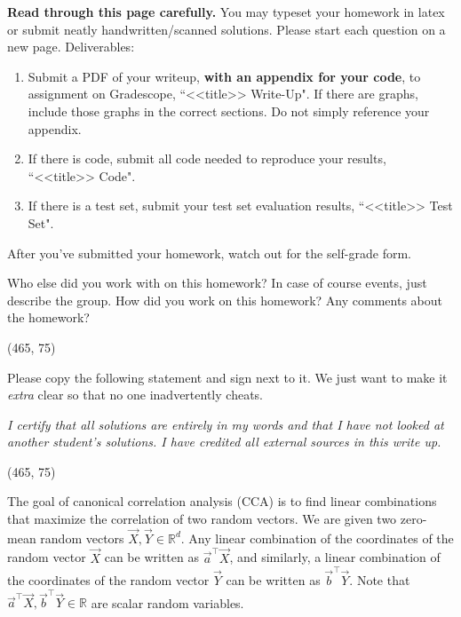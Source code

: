 \documentclass[preview]{standalone}
\begin{document}
\fontsize{12}{15}\selectfont


\textbf{Read through this page carefully.} You may typeset your homework in latex or submit neatly handwritten/scanned solutions. Please start each question on a new page. Deliverables:

\begin{enumerate}
  \item Submit a PDF of your writeup, \textbf{with an appendix for your code}, to assignment on Gradescope, ``<<title>> Write-Up". If there are graphs, include those graphs in the correct sections. Do not simply reference your appendix.
  \item If there is code, submit all code needed to reproduce your results, ``<<title>> Code".
  \item If there is a test set, submit your test set evaluation results, ``<<title>> Test Set".
\end{enumerate}

After you've submitted your homework, watch out for the self-grade form.

\begin{Parts}

\Part Who else did you work with on this homework? In case of course events, just describe the group. How did you work on this homework? Any comments about the homework?

\vspace{15pt}
\framebox(465, 75){}

\Part Please copy the following statement and sign next to it. We just want to make it \textit{extra} clear so that no one inadvertently cheats.

\textit{I certify that all solutions are entirely in my words and that I have not looked at another student's solutions. I have credited all external sources in this write up.}

\vspace{15pt}
\framebox(465, 75){}

\end{Parts}

\pagebreak



The goal of canonical correlation analysis (CCA) is to find linear combinations
that maximize the correlation of two random vectors.
We are given two zero-mean random vectors $\vec X, \vec Y \in \mathbb{R}^d$.
Any linear combination of the coordinates of the random vector $\vec X$ can be written as
$\vec{a}^\top \vec X$, and similarly, a linear combination of the coordinates of the random vector $\vec Y$ can be written as
$\vec{b}^\top \vec Y$.
Note that $\vec{a}^\top \vec X, \vec{b}^\top \vec Y \in \mathbb{R}$
are scalar random variables.
\end{document}
